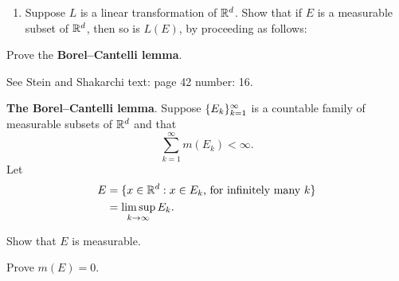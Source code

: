 \documentclass{../homework}
\begin{document}
\begin{problems}
  \begin{book}
    \begin{enumerate}[start=8]
    \item Suppose \(L\) is a linear transformation of \(\mathbb R^d\).  Show
      that if \(E\) is a measurable subset of \(\mathbb R^d\), then so is
      \(L(E)\), by proceeding as follows:
    \end{enumerate}
  \end{book}

  \begin{solution}
    \begin{problems}
    \item
    \item
    \end{problems}
  \end{solution}

\item Prove the \textbf{Borel--Cantelli lemma}.

  See Stein and Shakarchi text: page 42 number: 16.

  \begin{book}
    \textbf{The Borel--Cantelli lemma}.  Suppose
    \(\{E_k\}_{k=1}^\infty\) is a countable family of measurable
    subsets of \(\mathbb R^d\) and that
    \[
      \sum_{k=1}^\infty m(E_k) < \infty.
    \]
    Let
    \begin{align*}
      E &= \{
          x \in \mathbb R^d
          : \text{\(x \in E_k\), for infinitely many \(k\)}
          \} \\
        &= \limsup_{k\to\infty} E_k.
    \end{align*}
    \begin{problems}
    \item Show that \(E\) is measurable.
    \item Prove \(m(E) = 0\).
    \end{problems}
  \end{book}


\end{problems}
\end{document}
